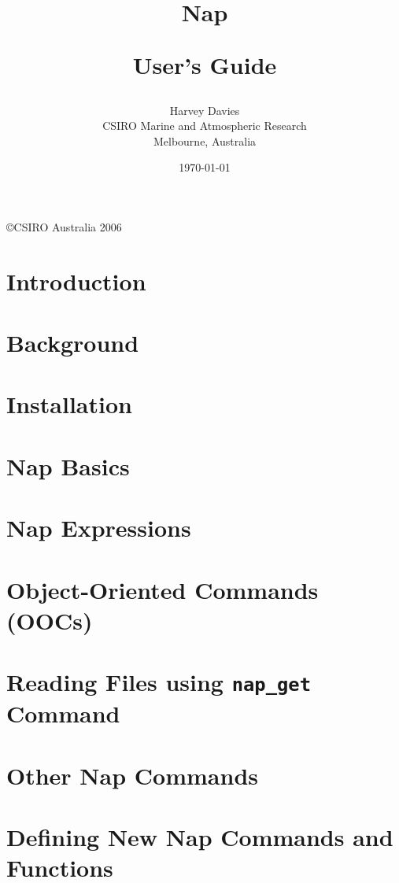 \documentclass[a4paper]{book}
\title {Nap 

User's Guide}
\author{Harvey Davies\\CSIRO Marine and Atmospheric Research\\Melbourne, Australia}
\date{\today}
\begin{document}
\maketitle
\copyright CSIRO Australia 2006
\tableofcontents

\chapter{Introduction}
    
    
    
\chapter{Background}
    
    
    
    
    
    
\chapter{Installation}
    
    
\chapter{Nap Basics}
    
    
    
    
    
\chapter{Nap Expressions}
    
    
    
    
    
\chapter{Object-Oriented Commands (OOCs)}
    
    
    
    
    
\chapter{Reading Files using \texttt{nap\_get} Command}
    
\chapter{Other Nap Commands}
    
    
\chapter{Defining New Nap Commands and Functions}
    
    
\end{document}
